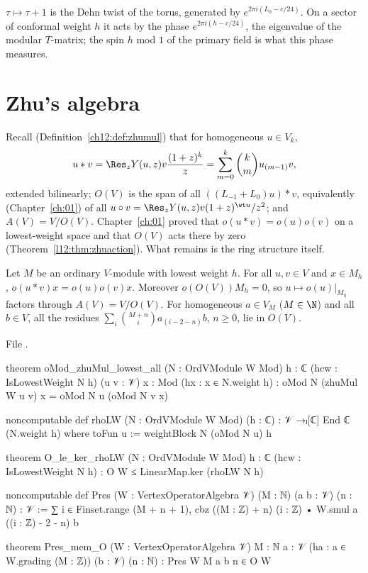\begin{physics}
$\tau\mapsto\tau+1$ is the Dehn twist of the torus, generated by $e^{2\pi i(L_0-c/24)}$. On a sector of
conformal weight $h$ it acts by the phase $e^{2\pi i(h-c/24)}$, the eigenvalue of the modular $T$-matrix; the
spin $h$ mod $1$ of the primary field is what this phase measures.
\end{physics}

\section{Zhu's algebra}\label{l12:sec:zhu}

Recall (Definition~\ref{ch12:def:zhumul}) that for homogeneous $u\in V_k$,
\begin{equation*}
 u*v = \Res_z Y(u,z)v\frac{(1+z)^k}{z} = \sum_{m=0}^k\binom km u_{(m-1)}v,
\end{equation*}
extended bilinearly; $O(V)$ is the span of all $((L_{-1}+L_0)u)*v$, equivalently (Chapter~\ref{ch:01}) of all
$u\circ v = \Res_zY(u,z)v(1+z)^{\wt u}/z^2$; and $A(V) = V/O(V)$. Chapter~\ref{ch:01} proved that
$o(u*v) = o(u)o(v)$ on a lowest-weight space and that $O(V)$ acts there by zero
(Theorem~\ref{l12:thm:zhuaction}). What remains is the ring structure itself.

\begin{theorem}\label{l12:thm:zhuaction}
Let $M$ be an ordinary $V$-module with lowest weight $h$. For all $u,v\in V$ and $x\in M_h$,
$o(u*v)x = o(u)o(v)x$. Moreover $o(O(V))M_h = 0$, so $u\mapsto o(u)|_{M_h}$ factors through $A(V) = V/O(V)$. For homogeneous
$a\in V_M$ ($M\in\N$) and all $b\in V$, all the residues $\sum_i\binom{M+n}{i}a_{(i-2-n)}b$, $n\ge0$, lie in $O(V)$.
\end{theorem}
\noindent File .
\begin{leancode}
theorem oMod_zhuMul_lowest_all (N : OrdVModule W Mod) {h : ℂ} (hcw : IsLowestWeight N h)
    (u v : 𝒱) {x : Mod} (hx : x ∈ N.weight h) :
    oMod N (zhuMul W u v) x = oMod N u (oMod N v x)

noncomputable def rhoLW (N : OrdVModule W Mod) (h : ℂ) : 𝒱 →ₗ[ℂ] End ℂ (N.weight h) where
  toFun u := weightBlock N (oMod N u) h

theorem O_le_ker_rhoLW (N : OrdVModule W Mod) {h : ℂ} (hcw : IsLowestWeight N h) :
    O W ≤ LinearMap.ker (rhoLW N h)

noncomputable def Pres (W : VertexOperatorAlgebra 𝒱) (M : ℕ) (a b : 𝒱) (n : ℕ) : 𝒱 :=
  ∑ i ∈ Finset.range (M + n + 1), cbz ((M : ℤ) + n) (i : ℤ) • W.smul a ((i : ℤ) - 2 - n) b

theorem Pres_mem_O (W : VertexOperatorAlgebra 𝒱) {M : ℕ} {a : 𝒱}
    (ha : a ∈ W.grading (M : ℤ)) (b : 𝒱) (n : ℕ) : Pres W M a b n ∈ O W
\end{leancode}

